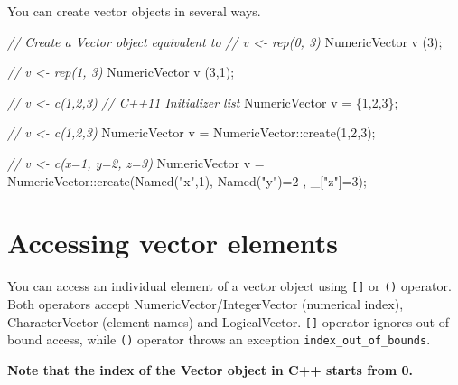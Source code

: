 \documentclass[
]{book}
\newenvironment{Shaded}{\begin{snugshade}}{\end{snugshade}}
\newcommand{\CommentTok}[1]{\textcolor[rgb]{0.56,0.35,0.01}{\textit{#1}}}
\newcommand{\DecValTok}[1]{\textcolor[rgb]{0.00,0.00,0.81}{#1}}
\newcommand{\NormalTok}[1]{#1}
\newcommand{\StringTok}[1]{\textcolor[rgb]{0.31,0.60,0.02}{#1}}
\begin{document}
You can create vector objects in several ways.

\begin{Shaded}
\begin{Highlighting}[]
\CommentTok{// Create a Vector object equivalent to}
\CommentTok{// v <- rep(0, 3)}
\NormalTok{NumericVector v (}\DecValTok{3}\NormalTok{);}

\CommentTok{// v <- rep(1, 3)}
\NormalTok{NumericVector v (}\DecValTok{3}\NormalTok{,}\DecValTok{1}\NormalTok{);}

\CommentTok{// v <- c(1,2,3) }
\CommentTok{// C++11 Initializer list}
\NormalTok{NumericVector v = \{}\DecValTok{1}\NormalTok{,}\DecValTok{2}\NormalTok{,}\DecValTok{3}\NormalTok{\}; }

\CommentTok{// v <- c(1,2,3)}
\NormalTok{NumericVector v = NumericVector::create(}\DecValTok{1}\NormalTok{,}\DecValTok{2}\NormalTok{,}\DecValTok{3}\NormalTok{);}

\CommentTok{// v <- c(x=1, y=2, z=3)}
\NormalTok{NumericVector v =}
\NormalTok{  NumericVector::create(Named(}\StringTok{"x"}\NormalTok{,}\DecValTok{1}\NormalTok{), Named(}\StringTok{"y"}\NormalTok{)=}\DecValTok{2}\NormalTok{ , _[}\StringTok{"z"}\NormalTok{]=}\DecValTok{3}\NormalTok{);}
\end{Highlighting}
\end{Shaded}

\hypertarget{accessing-vector-elements}{%
\section{Accessing vector elements}\label{accessing-vector-elements}}

You can access an individual element of a vector object using \texttt{{[}{]}} or \texttt{()} operator. Both operators accept NumericVector/IntegerVector (numerical index), CharacterVector (element names) and LogicalVector. \texttt{{[}{]}} operator ignores out of bound access, while \texttt{()} operator throws an exception \texttt{index\_out\_of\_bounds}.

\textbf{Note that the index of the Vector object in C++ starts from 0.}
\end{document}
